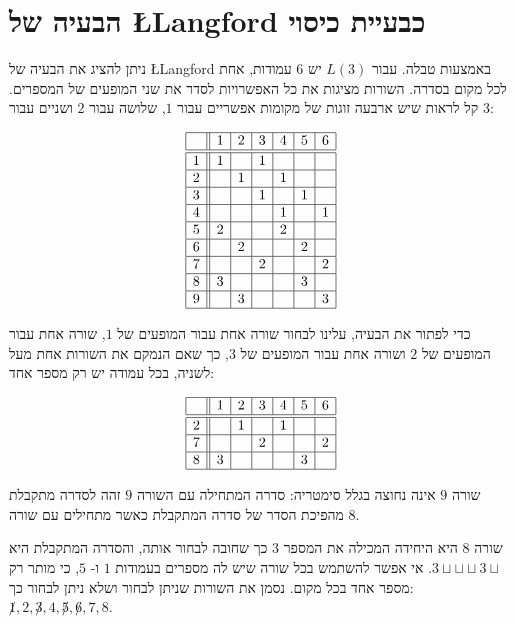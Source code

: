 \section{
הבעיה של
\L{Langford}
כבעיית כיסוי}
\label{s.langford-covering}

ניתן להציג את הבעיה של
\L{Langford}
באמצעות טבלה. עבור
$L(3)$
יש
$6$
עמודות, אחת לכל מקום בסדרה. השורות מציגות את כל האפשרויות לסדר את  שני המופעים של המספרים. קל לראות שיש ארבעה זוגות של מקומות אפשריים עבור
$1$,
שלושה עבור
$2$
ושניים עבור
$3$:

\[
\begin{array}{|c||c|c|c|c|c|c|}
\hline
&1&2&3&4&5&6\\\hline\hline
1&1&&1&&&\\\hline
2&&1&&1&&\\\hline
3&&&1&&1&\\\hline
4&&&&1&&1\\\hline
5&2&&&2&&\\\hline
6&&2&&&2&\\\hline
7&&&2&&&2\\\hline
8&3&&&&3&\\\hline
9&&3&&&&3\\\hline
\end{array}
\]


כדי לפתור את הבעיה, עלינו לבחור שורה אחת עבור המופעים של
$1$,
שורה אחת עבור המופעים של
$2$
ושורה אחת עבור המופעים של
$3$,
כך שאם הנמקם את השורות אחת מעל לשניה, בכל עמודה יש רק מספר אחד: 

\[
\begin{array}{|c||c|c|c|c|c|c|}
\hline
&1&2&3&4&5&6\\\hline\hline
2&&1&&1&&\\\hline
7&&&2&&&2\\\hline
8&3&&&&3&\\\hline
\end{array}
\]


שורה
$9$
אינה נחוצה בגלל סימטריה: סדרה המתחילה עם השורה
$9$
זהה לסדרה מתקבלת מהפיכת הסדר של סדרה המתקבלת כאשר מתחילים עם שורה
$8$.

שורה 
$8$
היא היחידה המכילה את המספר
$3$
כך שחובה לבחור אותה, והסדרה המתקבלת היא
$3\sqcup  \sqcup  \sqcup  3\sqcup $. 
אי אפשר להשתמש בכל שורה שיש לה מספרים בעמודות
$1$
ו-
$5$,
כי מותר רק מספר אחד בכל מקום. נסמן את השורות שניתן לבחור ושלא ניתן לבחור כך:
$\not 1,2,\not 3,4,\not 5, \not 6, 7, 8$.

